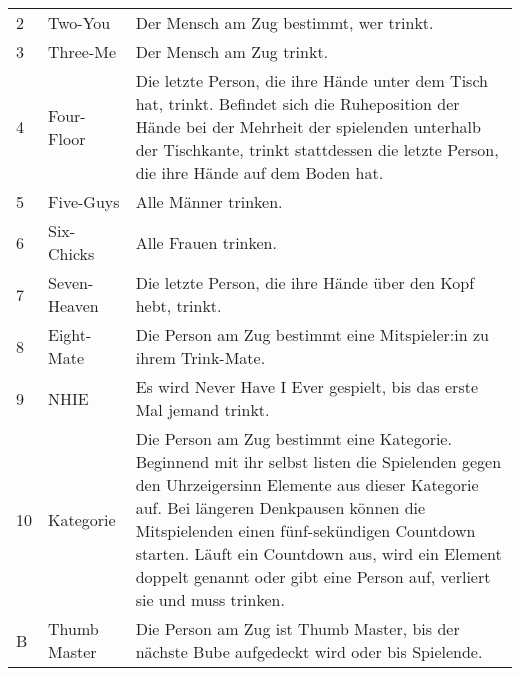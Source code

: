 \begin{tabular}{p{1em} p{4em} p{23em}}
	2  & Two-You        & Der Mensch am Zug bestimmt, wer trinkt.                                                                                                              \\[1ex]
	3  & Three-Me       & Der Mensch am Zug trinkt.                                                                                                                            \\[1ex]
	4  & Four-Floor     & Die letzte Person, die ihre Hände unter dem Tisch hat, trinkt.
	Befindet sich die Ruheposition der Hände bei der Mehrheit der spielenden unterhalb der Tischkante, trinkt stattdessen die letzte Person, die ihre Hände auf dem Boden hat. \\[1ex]
	5  & Five-Guys      & Alle Männer trinken.                                                                                                                                 \\[1ex]
	6  & Six-Chicks     & Alle Frauen trinken.                                                                                                                                 \\[1ex]
	7  & Seven-Heaven   & Die letzte Person, die ihre Hände über den Kopf hebt, trinkt.                                                                                        \\[1ex]
	8  & Eight-Mate     & Die Person am Zug bestimmt eine Mitspieler:in zu ihrem Trink-Mate.                                                                                   \\[1ex]
	9  & NHIE           & Es wird \glqq{} Never Have I Ever\grqq{} gespielt, bis das erste Mal jemand trinkt.                                                                    \\[1ex]
	10 & Kategorie      & Die Person am Zug bestimmt eine Kategorie.
	Beginnend mit ihr selbst listen die Spielenden gegen den Uhrzeigersinn Elemente aus dieser Kategorie auf.
	Bei längeren Denkpausen können die Mitspielenden einen fünf-sekündigen Countdown starten.
	Läuft ein Countdown aus, wird ein Element doppelt genannt oder gibt eine Person auf, verliert sie und muss trinken.                                                        \\[1ex]
	B  & Thumb Master   & Die Person am Zug ist Thumb Master, bis der nächste Bube aufgedeckt wird oder bis Spielende.                                                         \\[1ex]

\end{tabular}
